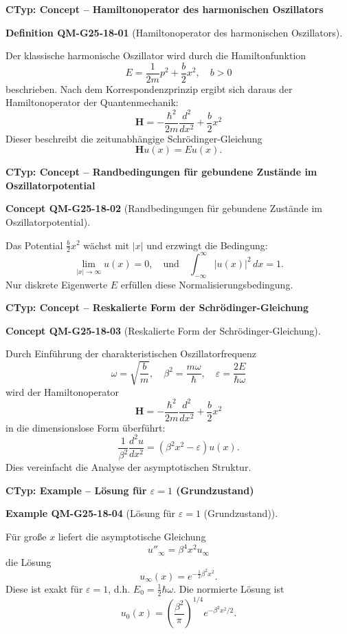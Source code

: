 \documentclass[10pt, letterpaper]{article}
\newcommand{\CustomHeading}[3]{%
  \par\medskip\noindent%
  \textbf{#1 #2} \textnormal{(#3)}.\enskip%
}
\newenvironment{DEF}[2]{\begin{unitbox}\CustomHeading{Definition}{#1}{#2}}{\end{unitbox}}
\newenvironment{EXA}[2]{\begin{unitbox}\CustomHeading{Example}{#1}{#2}}{\end{unitbox}}
\newenvironment{CONC}[2]{\begin{unitbox}\CustomHeading{Concept}{#1}{#2}}{\end{unitbox}}
\begin{document}
\textbf{CTyp: Concept – Hamiltonoperator des harmonischen Oszillators}

\begin{DEF}{QM-G25-18-01}{Hamiltonoperator des harmonischen Oszillators}
Der klassische harmonische Oszillator wird durch die Hamiltonfunktion
\[
E=\frac{1}{2m}p^2 + \frac{b}{2}x^2, \quad b > 0
\]
beschrieben. Nach dem Korrespondenzprinzip ergibt sich daraus der Hamiltonoperator der Quantenmechanik:
\[
\mathbf{H} = -\frac{\hbar^2}{2m}\frac{d^2}{dx^2} + \frac{b}{2}x^2
\]
Dieser beschreibt die zeitunabhängige Schrödinger-Gleichung
\[
\mathbf{H} u(x) = E u(x).
\]
\end{DEF}



\textbf{CTyp: Concept – Randbedingungen für gebundene Zustände im Oszillatorpotential}

\begin{CONC}{QM-G25-18-02}{Randbedingungen für gebundene Zustände im Oszillatorpotential}
Das Potential $\frac{b}{2}x^2$ wächst mit $|x|$ und erzwingt die Bedingung:
\[
\lim_{|x|\to\infty} u(x) = 0, \quad \text{und} \quad \int_{-\infty}^{\infty} |u(x)|^2 \, dx = 1.
\]
Nur diskrete Eigenwerte $E$ erfüllen diese Normalisierungsbedingung.
\end{CONC}



\textbf{CTyp: Concept – Reskalierte Form der Schrödinger-Gleichung}



\begin{CONC}{QM-G25-18-03}{Reskalierte Form der Schrödinger-Gleichung}
Durch Einführung der charakteristischen Oszillatorfrequenz
\[
\omega = \sqrt{\frac{b}{m}}, \quad \beta^2 = \frac{m\omega}{\hbar}, \quad \varepsilon = \frac{2E}{\hbar\omega}
\]
wird der Hamiltonoperator
\[
\mathbf{H} = -\frac{\hbar^2}{2m} \frac{d^2}{dx^2} + \frac{b}{2} x^2
\]
in die dimensionslose Form überführt:
\[
\frac{1}{\beta^2} \frac{d^2 u}{dx^2} = \left( \beta^2 x^2 - \varepsilon \right) u(x).
\]
Dies vereinfacht die Analyse der asymptotischen Struktur.
\end{CONC}


\textbf{CTyp: Example – Lösung für $\varepsilon = 1$ (Grundzustand)}

\begin{EXA}{QM-G25-18-04}{Lösung für $\varepsilon = 1$ (Grundzustand)}
Für große $x$ liefert die asymptotische Gleichung
\[
u''_\infty = \beta^4 x^2 u_\infty
\]
die Lösung
\[
u_\infty(x) = e^{-\frac{1}{2}\beta^2 x^2}.
\]
Diese ist exakt für $\varepsilon = 1$, d.h. $E_0 = \frac{1}{2}\hbar\omega$. Die normierte Lösung ist
\[
u_0(x) = \left(\frac{\beta^2}{\pi}\right)^{1/4} e^{-\beta^2 x^2 / 2}.
\]
\end{EXA}
\end{document}
